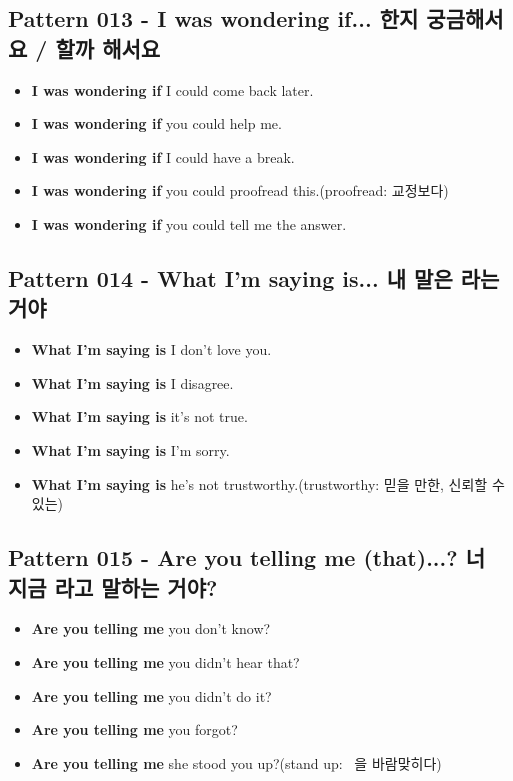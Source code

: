 \documentclass[11pt]{oblivoir}
\begin{document}
\subsection{Pattern 013 - I was wondering if... \texttildelow 한지 궁금해서요 / \texttildelow 할까 해서요}
\begin{itemize}
  \item \textbf{I was wondering if} I could come back later.
  \item \textbf{I was wondering if} you could help me.
  \item \textbf{I was wondering if} I could have a break.
  \item \textbf{I was wondering if} you could proofread this.(proofread: 교정보다)
  \item \textbf{I was wondering if} you could tell me the answer.
\end{itemize}

\subsection{Pattern 014 - What I'm saying is... \texttildelow 내 말은 \texttildelow 라는 거야}
\begin{itemize}
  \item \textbf{What I'm saying is} I don't love you.
  \item \textbf{What I'm saying is} I disagree.
  \item \textbf{What I'm saying is} it's not true.
  \item \textbf{What I'm saying is} I'm sorry.
  \item \textbf{What I'm saying is} he's not trustworthy.(trustworthy: 믿을 만한, 신뢰할 수 있는)
\end{itemize}

\subsection{Pattern 015 - Are you telling me (that)...? 너 지금 \texttildelow 라고 말하는 거야?}
\begin{itemize}
  \item \textbf{Are you telling me} you don't know?
  \item \textbf{Are you telling me} you didn't hear that?
  \item \textbf{Are you telling me} you didn't do it?
  \item \textbf{Are you telling me} you forgot?
  \item \textbf{Are you telling me} she stood you up?(stand \texttildelow up: ~을 바람맞히다)
\end{itemize}
\end{document}
